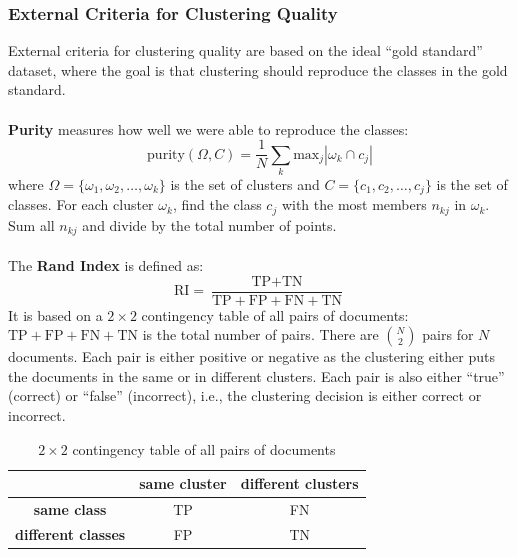 \documentclass[a4paper,11pt]{article}
\begin{document}
\subsubsection{External Criteria for Clustering Quality}
External criteria for clustering quality are based on the ideal ``gold standard'' dataset, where the goal is that clustering should reproduce the classes in the gold standard.
\\\\
\textbf{Purity} measures how well we were able to reproduce the classes:
\[
    \text{purity}(\Omega, C) = \frac{1}{N} \sum_k \text{max}_j | \omega_k \cap c_j |
\]
where $\Omega = \{ \omega_1, \omega_2, \dots, \omega_k \}$ is the set of clusters and $C = \{ c_1, c_2, \dots, c_j \}$ is the set of classes.
For each cluster $\omega_k$, find the class $c_j$ with the most members $n_{kj}$
in $\omega_k$.
Sum all $n_{kj}$ and divide by the total number of points.
\\\\
The \textbf{Rand Index} is defined as:
\[
    \text{RI} = \frac{ \text{TP} + \text{TN} }{ \text{TP} + \text{FP} + \text{FN} + \text{TN} }
\]
It is based on a $2 \times 2$ contingency table of all pairs of documents:
$\text{TP} + \text{FP} + \text{FN} + \text{TN}$ is the total number of pairs.
There are $\binom{N}{2}$ pairs for $N$ documents.
Each pair is either positive or negative as the clustering either puts the documents in the same or in different clusters.
Each pair is also either ``true'' (correct) or ``false'' (incorrect), i.e., the clustering decision is either correct or incorrect.

\begin{table}[H]
    \centering
    \begin{tabular}{|c|c|c|}
    \hline
                                & \textbf{same cluster} & \textbf{different clusters} \\ \hline
    \textbf{same class}         & TP                    & FN         \\ \hline
    \textbf{different classes}  & FP                    & TN         \\ \hline
    \end{tabular}
    \caption{$2 \times 2$ contingency table of all pairs of documents}
\end{table}
\end{document}
